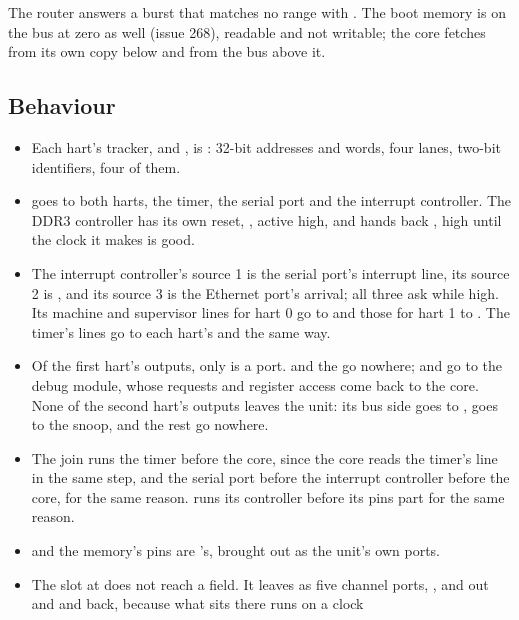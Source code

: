 The router answers a burst that matches no range with .
The boot memory is on the bus at zero as well (issue 268), readable and
not writable; the core fetches from its own copy below 
and from the bus above it.


\subsection*{Behaviour}

\begin{itemize}
\item Each hart's tracker,  and , is
: 32-bit addresses and words, four
lanes, two-bit identifiers, four of them.
\item {} goes to both harts, the timer, the serial port and the
interrupt controller. The DDR3 controller has its own reset,
, active high, and hands back , high
until the clock it makes is good.
\item The interrupt controller's source 1 is the serial port's
interrupt line, its source 2 is , and its source 3 is the
Ethernet port's arrival; all three ask while high.
Its machine and supervisor lines for hart 0 go to  and
those for hart 1 to . The timer's lines go to each hart's
 and  the same way.
\item Of the first hart's outputs, only  is a port. 
and the  go nowhere;  and 
go to the debug module, whose requests and register access come back
to the core. None of the second hart's outputs leaves the unit: its
bus side goes to ,  goes to the snoop, and
the rest go nowhere.
\item The join runs the timer before the core, since the core reads
the timer's line in the same step, and the serial port before the
interrupt controller before the core, for the same reason.  runs its controller
before its pins part for the same reason.
\item {} and the memory's pins are 's,
brought out as the unit's own ports.
\item The slot at  does not reach a field. It leaves as
five channel ports, ,  and  out and
 and  back, because what sits there runs on a clock

\end{itemize}

